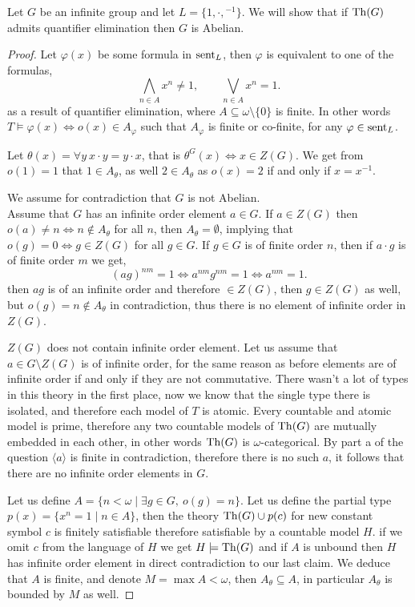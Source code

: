 \subquestion{}
Let $G$ be an infinite group and let $L = \{1, \cdot, {}^{-1} \}$.
We will show that if $\operatorname{Th}(G)$ admits quantifier elimination then $G$ is Abelian.
\begin{proof}
	Let $\varphi(x)$ be some formula in $\operatorname{sent}_L$, then $\varphi$ is equivalent to one of the formulas,
	\[
		\bigwedge_{n \in A} x^n \ne 1,
		\qquad
		\bigvee_{n \in A} x^n = 1
	.\]
	as a result of quantifier elimination, where $A \subseteq \omega \setminus \{ 0 \}$ is finite.
	In other words $T \models \varphi(x) \iff o(x) \in A_\varphi$ such that $A_{\varphi}$ is finite or co-finite, for any $\varphi \in \operatorname{sent}_L$.

	Let $\theta(x) = \forall y\ x \cdot y = y \cdot x$, that is $\theta^G(x) \iff x \in Z(G)$.
	We get from $o(1) = 1$ that $1 \in A_{\theta}$, as well $2 \in A_{\theta}$ as $o(x) = 2$ if and only if $x = x^{-1}$.

	We assume for contradiction that $G$ is not Abelian. \\
	Assume that $G$ has an infinite order element $a \in G$.
	If $a \in Z(G)$ then $o(a) \ne n \iff n \notin A_{\theta}$ for all $n$, then $A_{\theta} = \emptyset$, implying that $o(g) = 0 \iff g \in Z(G)$ for all $g \in G$.
	If $g \in G$ is of finite order $n$, then if $a \cdot g$ is of finite order $m$ we get,
	\[
		{(a g)}^{n m} = 1
		\iff a^{n m} g^{n m} = 1
		\iff a^{n m} = 1
	.\]
	then $a g$ is of an infinite order and therefore $\in Z(G)$, then $g \in Z(G)$ as well, but $o(g) = n \notin A_{\theta}$ in contradiction, thus there is no element of infinite order in $Z(G)$.

	$Z(G)$ does not contain infinite order element.
	Let us assume that $a \in G \setminus Z(G)$ is of infinite order, for the same reason as before elements are of infinite order if and only if they are not commutative.
	There wasn't a lot of types in this theory in the first place, now we know that the single type there is isolated, and therefore each model of $T$ is atomic.
	Every countable and atomic model is prime, therefore any two countable models of $\operatorname{Th}(G)$ are mutually embedded in each other, in other words $\operatorname{Th}(G)$ is $\omega$-categorical.
	By part a of the question $\langle a \rangle$ is finite in contradiction, therefore there is no such $a$, it follows that there are no infinite order elements in $G$.

	Let us define $A = \{ n < \omega \mid \exists g \in G,\ o(g) = n \}$.
	Let us define the partial type $p(x) = \{ x^n = 1 \mid n \in A \}$, then the theory $\operatorname{Th}(G) \cup p(c)$ for new constant symbol $c$ is finitely satisfiable therefore satisfiable by a countable model $H$.
	if we omit $c$ from the language of $H$ we get $H \models \operatorname{Th}(G)$ and if $A$ is unbound then $H$ has infinite order element in direct contradiction to our last claim.
	We deduce that $A$ is finite, and denote $M = \max A < \omega$, then $A_{\theta} \subseteq A$, in particular $A_{\theta}$ is bounded by $M$ as well.


\end{proof}
